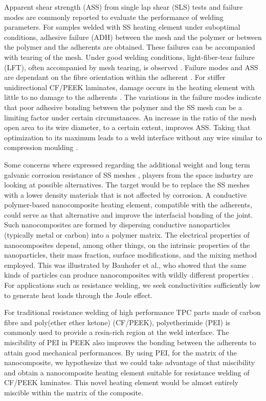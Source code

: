 \documentclass[11pt,review,times]{elsarticle}
\begin{document}
Apparent shear strength (ASS) from single lap shear (SLS) tests and failure modes are commonly reported to evaluate the performance of welding parameters. 
For samples welded with SS heating element under suboptimal conditions, adhesive failure (ADH) between the mesh and the polymer or between the polymer and the adherents are obtained. 
These failures can be accompanied with tearing of the mesh. 
Under good welding conditions, light-fiber-tear failure (LFT), often accompanied by mesh tearing, is observed \cite{Shi2014}. 
Failure modes and ASS are dependant on the fibre orientation within the adherent \cite{Shi2013a}. 
For stiffer unidirectional CF/PEEK laminates, damage occurs in the heating element with little to no damage to the adherents \cite{Dube2015}. 
The variations in the failure modes indicate that poor adhesive bonding between the polymer and the SS mesh \cite{Dube2007,Dube2012a,Dube2009a,Shi2014,Shi2015a} can be a limiting factor under certain circumstances. 
An increase in the ratio of the mesh open area to its wire diameter, to a certain extent, improves ASS. 
Taking that optimization to its maximum leads to a weld interface without any wire similar to compression moulding \cite{Dube2012a}. 

Some concerns where expressed regarding the additional weight and long term galvanic corrosion resistance of SS meshes \cite{Stavrov2005a}, players from the space industry are looking at possible alternatives.  
The target would be to replace the SS meshes with a lower density materials that is not affected by corrosion. 
A conductive polymer-based nanocomposite heating element, compatible with the adherents, could serve as that alternative and improve the interfacial bonding of the joint. 
Such nanocomposites are formed by dispersing conductive nanoparticles (typically metal or carbon) into a polymer matrix. 
The electrical properties of nanocomposites depend, among other things, on the intrinsic properties of the nanoparticles, their mass fraction, surface modifications, and the mixing method employed. 
This was illustrated by Bauhofer et al., who showed that the same kinds of particles can produce nanocomposites with wildly different properties \cite{Bauhofer2009}. 
For applications such as resistance welding, we seek conductivities sufficiently low to generate heat loads through the Joule effect. 

For traditional resistance welding of high performance TPC parts made of carbon fibre and poly(ether ether ketone) (CF/PEEK), polyetherimide (PEI) is commonly used to provide a resin-rich region at the weld interface. 
The miscibility of PEI in PEEK \cite{Crevecoeur1991} also improves the bonding between the adherents to attain good mechanical performances. 
By using PEI, for the matrix of the nanocomposite, we hypothesize that we could take advantage of that miscibility and obtain a nanocomposite heating element suitable for resistance welding of CF/PEEK laminates. 
This novel heating element would be almost entirely miscible within the matrix of the composite. 
\end{document}

